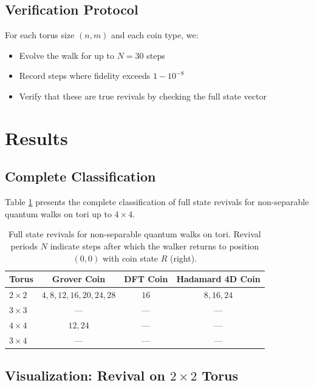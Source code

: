 \documentclass[12pt]{article}
\begin{document}
\subsection{Verification Protocol}

For each torus size $(n,m)$ and each coin type, we:
\begin{itemize}
    \item Evolve the walk for up to $N = 30$ steps
    \item Record steps where fidelity exceeds $1 - 10^{-8}$
    \item Verify that these are true revivals by checking the full state vector
\end{itemize}

\section{Results}

\subsection{Complete Classification}

Table \ref{tab:non_separable_revivals} presents the complete classification of full state revivals for non-separable quantum walks on tori up to $4 \times 4$.

\begin{table}[h!]
\centering
\caption{Full state revivals for non-separable quantum walks on tori. Revival periods $N$ indicate steps after which the walker returns to position $(0,0)$ with coin state $R$ (right).}
\label{tab:non_separable_revivals}
\begin{tabular}{lccc}
\toprule
\textbf{Torus} & \textbf{Grover Coin} & \textbf{DFT Coin} & \textbf{Hadamard 4D Coin} \\
\midrule
$2 \times 2$ & $4, 8, 12, 16, 20, 24, 28$ & $16$ & $8, 16, 24$ \\
$3 \times 3$ & --- & --- & --- \\
$4 \times 4$ & $12, 24$ & --- & --- \\
$3 \times 4$ & --- & --- & --- \\
\bottomrule
\end{tabular}
\end{table}

\subsection{Visualization: Revival on $2 \times 2$ Torus}
\end{document}
